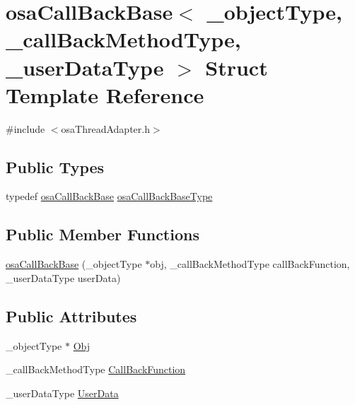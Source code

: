 \hypertarget{structosa_call_back_base}{\section{osa\-Call\-Back\-Base$<$ \-\_\-object\-Type, \-\_\-call\-Back\-Method\-Type, \-\_\-user\-Data\-Type $>$ Struct Template Reference}
\label{structosa_call_back_base}
}


{\ttfamily \#include $<$osa\-Thread\-Adapter.\-h$>$}

\subsection*{Public Types}
\begin{DoxyCompactItemize}
\item 
typedef \hyperlink{structosa_call_back_base}{osa\-Call\-Back\-Base} \hyperlink{structosa_call_back_base_ac0992ce98eed821dbeae7d6b41bc6682}{osa\-Call\-Back\-Base\-Type}
\end{DoxyCompactItemize}
\subsection*{Public Member Functions}
\begin{DoxyCompactItemize}
\item 
\hyperlink{structosa_call_back_base_a84cca5d9c6af2fc46d9fb0e3012e6a79}{osa\-Call\-Back\-Base} (\-\_\-object\-Type $\ast$obj, \-\_\-call\-Back\-Method\-Type call\-Back\-Function, \-\_\-user\-Data\-Type user\-Data)
\end{DoxyCompactItemize}
\subsection*{Public Attributes}
\begin{DoxyCompactItemize}
\item 
\-\_\-object\-Type $\ast$ \hyperlink{structosa_call_back_base_a3ff953518bf08a840f22a4ff7e5b7c28}{Obj}
\item 
\-\_\-call\-Back\-Method\-Type \hyperlink{structosa_call_back_base_abfc6585f7501daad7cee19ab0b8a10eb}{Call\-Back\-Function}
\item 
\-\_\-user\-Data\-Type \hyperlink{structosa_call_back_base_a1178c4cd366dc6de8a939accf7099974}{User\-Data}
\end{DoxyCompactItemize}


